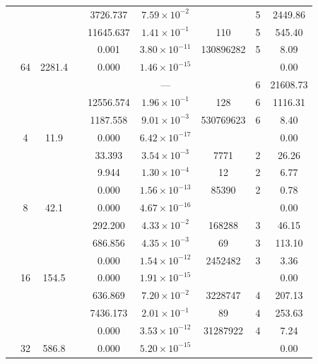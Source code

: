 \begin{table}[htbp]
\begin{tabular}{l S[table-format=3.0] S[table-format=4.1] l S[table-format=3.3] S[table-format=1.2e2] S[table-format=6.0] S[table-format=2.0] S[table-format=4.2]}
     &  &  &  & 3726.737 & $7.59 \times 10^{-2}$ & {\text{---}} & 5 & 2449.86 \\
     &  &  &  & 11645.637 & $1.41 \times 10^{-1}$ & 110 & 5 & 545.40 \\
     &  &  &  & 0.001 & $3.80 \times 10^{-11}$ & 130896282 & 5 & 8.09 \\
     & 64 & 2281.4 &  & 0.000 & $1.46 \times 10^{-15}$ & {\text{---}} & {\text{---}} & 0.00 \\
     &  &  &  & {\text{---}} & ${\text{---}}$ & {\text{---}} & 6 & 21608.73 \\
     &  &  &  & 12556.574 & $1.96 \times 10^{-1}$ & 128 & 6 & 1116.31 \\
     &  &  &  & 1187.558 & $9.01 \times 10^{-3}$ & 530769623 & 6 & 8.40 \\
    \midrule
     & 4 & 11.9 &  & 0.000 & $6.42 \times 10^{-17}$ & {\text{---}} & {\text{---}} & 0.00 \\
     &  &  &  & 33.393 & $3.54 \times 10^{-3}$ & 7771 & 2 & 26.26 \\
     &  &  &  & 9.944 & $1.30 \times 10^{-4}$ & 12 & 2 & 6.77 \\
     &  &  &  & 0.000 & $1.56 \times 10^{-13}$ & 85390 & 2 & 0.78 \\
     & 8 & 42.1 &  & 0.000 & $4.67 \times 10^{-16}$ & {\text{---}} & {\text{---}} & 0.00 \\
     &  &  &  & 292.200 & $4.33 \times 10^{-2}$ & 168288 & 3 & 46.15 \\
     &  &  &  & 686.856 & $4.35 \times 10^{-3}$ & 69 & 3 & 113.10 \\
     &  &  &  & 0.000 & $1.54 \times 10^{-12}$ & 2452482 & 3 & 3.36 \\
     & 16 & 154.5 &  & 0.000 & $1.91 \times 10^{-15}$ & {\text{---}} & {\text{---}} & 0.00 \\
     &  &  &  & 636.869 & $7.20 \times 10^{-2}$ & 3228747 & 4 & 207.13 \\
     &  &  &  & 7436.173 & $2.01 \times 10^{-1}$ & 89 & 4 & 253.63 \\
     &  &  &  & 0.000 & $3.53 \times 10^{-12}$ & 31287922 & 4 & 7.24 \\
     & 32 & 586.8 &  & 0.000 & $5.20 \times 10^{-15}$ & {\text{---}} & {\text{---}} & 0.00 \\

\end{tabular}
\end{table}
